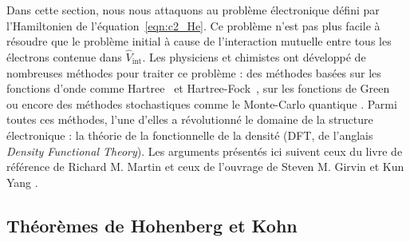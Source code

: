 Dans cette section, nous nous attaquons au problème électronique défini par l'Hamiltonien de l'équation~\eqref{eqn:c2_He}. Ce problème n'est pas plus facile à résoudre que le problème initial à cause de l'interaction mutuelle entre tous les électrons contenue dans $\hat{V}_\text{int}$. Les physiciens et chimistes ont développé de nombreuses méthodes pour traiter ce problème : des méthodes basées sur les fonctions d'onde comme Hartree~\cite{hartreeWaveMechanicsAtom1928,hartreeWaveMechanicsAtom1928a} et Hartree-Fock~\cite{fockNaeherungsmethodeZurLoesung1930,slaterNoteHartreesMethod1930,diracQuantumMechanicsManyelectron1929}, sur les fonctions de Green~\cite{martinTheoryManyParticleSystems1959,abrikosovMethodsQuantumField2012} ou encore des méthodes stochastiques comme le Monte-Carlo quantique \cite{ceperleyGroundStateElectron1980}. Parmi toutes ces méthodes, l'une d'elles a révolutionné le domaine de la structure électronique : la théorie de la fonctionnelle de la densité (DFT, de l'anglais \textit{Density Functional Theory}). Les arguments présentés ici suivent ceux du livre de référence de Richard M. Martin \cite{martinElectronicStructureBasic2004} et ceux de l'ouvrage de Steven M. Girvin et Kun Yang \cite{girvinModernCondensedMatter2019a}.

\subsection{Théorèmes de Hohenberg et Kohn}\label{sec:HK}

